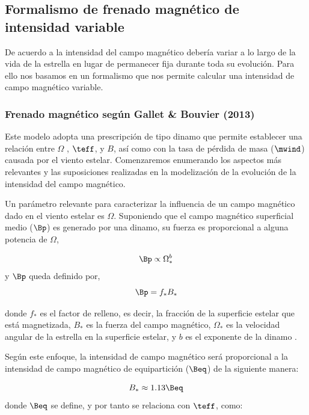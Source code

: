 \subsection{Formalismo de frenado magnético de intensidad variable} 
De acuerdo a \cite{Gallet2013} la intensidad del campo magnético debería variar a lo largo de la vida de la estrella en lugar de permanecer fija durante toda su evolución. Para ello nos basamos en un formalismo que nos permite calcular una intensidad de campo magnético variable. 

\subsubsection{Frenado magnético según Gallet \& Bouvier (2013)}
Este modelo adopta una prescripción de tipo dinamo que permite establecer una relación entre $\Omega$ , $\teff$, y $B$, así como con la tasa de pérdida de masa ($\mwind$) causada por el viento estelar. Comenzaremos enumerando los aspectos más relevantes y las suposiciones realizadas en la modelización de la evolución de la intensidad del campo magnético.\par 

Un parámetro relevante para caracterizar la influencia de un campo magnético dado en el viento estelar es $\Omega$.  Suponiendo que el campo magnético superficial medio ($\Bp$) es generado por una dinamo, su fuerza es proporcional a alguna potencia de $\Omega$,

\begin{equation}
	\Bp \propto \Omega_*^b \label{eq:mf_strenght}
\end{equation}
y $\Bp$ queda definido por,
\begin{equation}
	\Bp = f_*B_* \label{eq:bp}
\end{equation}

donde $f_*$ es el factor de relleno, es decir, la fracción de la superficie estelar que está magnetizada, $B_*$ es la fuerza del campo magnético, $\Omega_*$ es la velocidad angular de la estrella en la superficie estelar, y $b$ es el exponente de la dinamo \citep{Gallet2013}.\par

Según este enfoque, la intensidad de campo magnético será proporcional a la intensidad de campo magnético de equipartición ($\Beq$) de la siguiente manera:
 
\begin{equation}
	B_* \approx 1.13 \Beq \label{eq:mf_bstar}
\end{equation}
donde $\Beq$ se define, y por tanto se relaciona con $\teff$, como:

